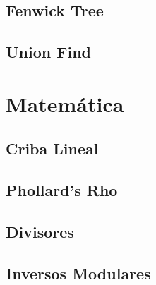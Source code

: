 \documentclass[a4paper,11pt,landscape,twocolumn]{article}
\begin{document}


\subsection{Fenwick Tree}




% 

\subsection{Union Find}



\section{Matemática}

\subsection{Criba Lineal}



\subsection{Phollard's Rho}



\subsection{Divisores}



\subsection{Inversos Modulares}




\end{document}
